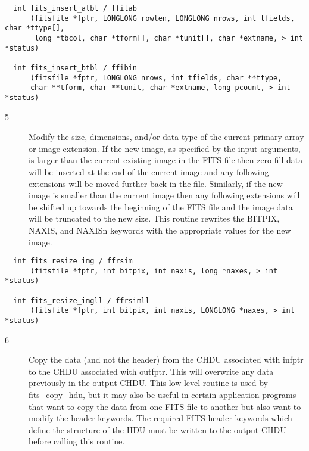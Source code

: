 \documentclass[11pt]{book}
\begin{document}
\begin{verbatim}
  int fits_insert_atbl / ffitab
      (fitsfile *fptr, LONGLONG rowlen, LONGLONG nrows, int tfields, char *ttype[],
       long *tbcol, char *tform[], char *tunit[], char *extname, > int *status)

  int fits_insert_btbl / ffibin
      (fitsfile *fptr, LONGLONG nrows, int tfields, char **ttype,
      char **tform, char **tunit, char *extname, long pcount, > int *status)
\end{verbatim}

\begin{description}
\item[5 ] Modify the size, dimensions, and/or data type of the current
    primary array or image extension. If the new image, as specified
    by the input arguments, is larger than the current existing image
    in the FITS file then zero fill data will be inserted at the end
    of the current image and any following extensions will be moved
    further back in the file.  Similarly, if the new image is
    smaller than the current image then any following extensions
    will be shifted up towards the beginning of the FITS file
    and the image data will be truncated to the new size.
    This routine rewrites the BITPIX, NAXIS, and NAXISn keywords
   with the appropriate values for the new image. \label{ffrsim}
\end{description}

\begin{verbatim}
  int fits_resize_img / ffrsim
      (fitsfile *fptr, int bitpix, int naxis, long *naxes, > int *status)

  int fits_resize_imgll / ffrsimll
      (fitsfile *fptr, int bitpix, int naxis, LONGLONG *naxes, > int *status)
\end{verbatim}

\begin{description}
\item[6 ] Copy the data (and not the header) from the CHDU associated with infptr
    to the CHDU associated with outfptr. This will overwrite any data
    previously in the output CHDU.  This low level routine is used by
    fits\_copy\_hdu, but it may also be useful in certain application programs
    that want to copy the data from one FITS file to another but also
    want to modify the header keywords. The required FITS header keywords
    which define the structure of the HDU must be written to the
   output CHDU before calling this routine. \label{ffcpdt}
\end{description}
\end{document}

